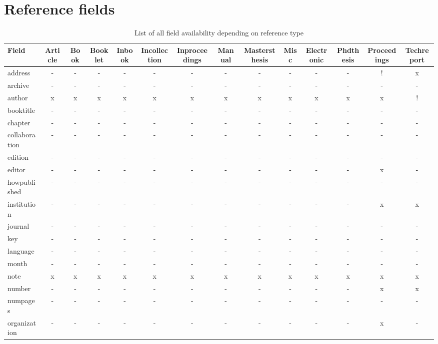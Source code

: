 \appendix
\section{Reference fields}
\begin{sidewaystable}
\caption{List of all field availability depending on reference type}
\footnotesize
\begin{tabular}{l c c c c c c c c c c c c c}
Field & Article & Book & Booklet & Inbook & Incollection & Inproceedings & Manual & Mastersthesis & Misc & Electronic & Phdthesis & Proceedings & Techreport \\
\hline
address       & - & - & - & - & - & - & - & - & - & - & - & ! & x \\
archive       & - & - & - & - & - & - & - & - & - & - & - & - & - \\
author        & x & x & x & x & x & x & x & x & x & x & x & x & ! \\
booktitle     & - & - & - & - & - & - & - & - & - & - & - & - & - \\
chapter       & - & - & - & - & - & - & - & - & - & - & - & - & - \\
collaboration & - & - & - & - & - & - & - & - & - & - & - & - & - \\
edition       & - & - & - & - & - & - & - & - & - & - & - & - & - \\
editor        & - & - & - & - & - & - & - & - & - & - & - & x & - \\
howpublished  & - & - & - & - & - & - & - & - & - & - & - & - & - \\
institution   & - & - & - & - & - & - & - & - & - & - & - & x & x \\
journal       & - & - & - & - & - & - & - & - & - & - & - & - & - \\
key           & - & - & - & - & - & - & - & - & - & - & - & - & - \\
language      & - & - & - & - & - & - & - & - & - & - & - & - & - \\
month         & - & - & - & - & - & - & - & - & - & - & - & - & - \\
note          & x & x & x & x & x & x & x & x & x & x & x & x & x \\
number        & - & - & - & - & - & - & - & - & - & - & - & x & x \\
numpages      & - & - & - & - & - & - & - & - & - & - & - & - & - \\
organization  & - & - & - & - & - & - & - & - & - & - & - & x & - \\

\end{tabular}
\end{sidewaystable}
